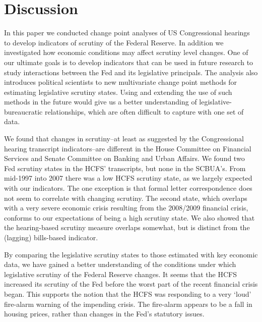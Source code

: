 \documentclass[a4paper]{article}\usepackage[]{graphicx}\usepackage[]{color}
\begin{document}
\section{Discussion}

In this paper we conducted change point analyses of US Congressional hearings to develop indicators of scrutiny of the Federal Reserve. In addition we investigated how economic conditions may affect scrutiny level changes. One of our ultimate goals is to develop indicators that can be used in future research to study interactions between the Fed and its legislative principals. The analysis also introduces political scientists to new multivariate change point methods for estimating legislative scrutiny states. Using and extending the use of such methods in the future would give us a better understanding of legislative-bureaucratic relationships, which are often difficult to capture with one set of data.

We found that changes in scrutiny--at least as suggested by the Congressional hearing transcript indicators--are different in the House Committee on Financial Services and Senate Committee on Banking and Urban Affairs. We found two Fed scrutiny states in the HCFS' transcripts, but none in the SCBUA's. From mid-1997 into 2007 there was a low HCFS scrutiny state, as we largely expected with our indicators. The one exception is that formal letter correspondence does not seem to correlate with changing scrutiny. The second state, which overlaps with a very severe economic crisis resulting from the 2008/2009 financial crisis, conforms to our expectations of being a high scrutiny state. We also showed that the hearing-based scrutiny measure overlaps somewhat, but is distinct from the (lagging) bills-based indicator.

By comparing the legislative scrutiny states to those estimated with key economic data, we have gained a better understanding of the conditions under which legislative scrutiny of the Federal Reserve changes. It seems that the HCFS increased its scrutiny of the Fed before the worst part of the recent financial crisis began. This supports the notion that the HCFS was responding to a very `loud' fire-alarm warning of the impending crisis. The fire-alarm appears to be a fall in housing prices, rather than changes in the Fed's statutory issues.




\end{document}
